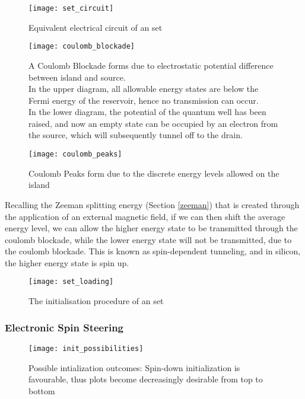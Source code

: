 \begin{figure}[htbp!]
	\centering
	\texttt{[image: set\_circuit]}
	\caption{Equivalent electrical circuit of an \gls{set}}
	\label{fig::set_circuit}
\end{figure}

\begin{figure}[htbp!]
	\centering
	\texttt{[image: coulomb\_blockade]}
	\caption{A Coulomb Blockade \cite{coulomb_blockade} forms due to electrostatic potential difference between island and source.\\ In the upper diagram, all allowable energy states are below the Fermi energy of the reservoir, hence no transmission can occur.\\ In the lower diagram, the potential of the quantum well has been raised, and now an empty state can be occupied by an electron from the source, which will subsequently tunnel off to the drain.}
	\label{coulomb_blockade}
\end{figure}

\begin{figure}[htbp!]
	\centering
	\texttt{[image: coulomb\_peaks]}
	\caption{Coulomb Peaks form due to the discrete energy levels allowed on the island}
	\label{fig::coulomb_peaks}
\end{figure}



Recalling the Zeeman splitting energy (Section \ref{zeeman}) that is created through the application of an external magnetic field, if we can then shift the average energy level, we can allow the higher energy state to be transmitted through the coulomb blockade, while the lower energy state will not be transmitted, due to the coulomb blockade. This is known as spin-dependent tunneling, and in silicon, the higher energy state is spin up.

\begin{figure}[htbp!]
	\centering
	\texttt{[image: set\_loading]}
	\caption{The initialisation procedure of an \gls{set}}
	\label{fig::set_loading}
\end{figure}


\subsubsection{Electronic Spin Steering}

\begin{figure}[htbp!]
	\centering
	\texttt{[image: init\_possibilities]}
	\caption{Possible intialization outcomes: Spin-down initialization is favourable, thus plots become decreasingly desirable from top to bottom}
	\label{fig::init_possibilities}
\end{figure}

